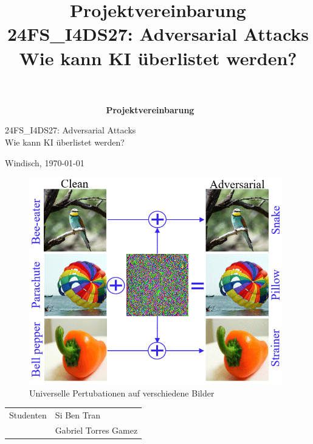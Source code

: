 \title{\textbf{Projektvereinbarung}\break \\ 24FS\_I4DS27: Adversarial Attacks \\ Wie kann KI überlistet werden?} %

\begin{titlepage}
    \textcolor{white}{Easteregg: Team Secondos}
    \vfill
    \centering
    \vspace{0.5cm}
    \huge{\textbf{Projektvereinbarung}}
    
    \vspace{0.5cm}
    \huge{24FS\_I4DS27: Adversarial Attacks \\ Wie kann KI überlistet werden?}
    \vspace{0.5cm}
    
    \Large{Windisch, \germandate\today}      

    \vfill
    
    \begin{figure}[H]
        \centering
        \includegraphics[width=11cm]{01-images/01-titleimage.png}
        \caption{Universelle Pertubationen auf verschiedene Bilder \cite{akhtar_advances_2021}}
        \label{01-titleimage}
    \end{figure}
    
    \vfill

    \large{
    \begin{tabular}{@{}p{7cm}l}
        Studenten                  &    Si Ben Tran\\
                                   &    Gabriel Torres Gamez\\[2ex]
        

\end{tabular}}
\end{titlepage}
